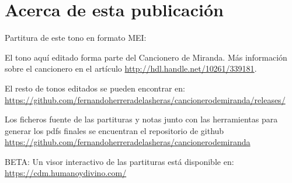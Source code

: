 
\section*{\centering\LARGE{Acerca de esta publicación}}

\vspace{0.5cm}



Partitura de este tono en formato MEI: \href{\mymeilink}{\mymeiname}

\vspace{0.5cm}

El tono aquí editado forma parte del Cancionero de Miranda. Más información sobre el cancionero en el artículo \url{http://hdl.handle.net/10261/339181}.

\vspace{0.5cm}

El resto de tonos editados se pueden encontrar en: \url{https://github.com/fernandoherreradelasheras/cancionerodemiranda/releases/}

\vspace{0.5cm}

Los ficheros fuente de las partituras y notas junto con las herramientas para generar los pdfs finales se encuentran el repositorio de github \url{https://github.com/fernandoherreradelasheras/cancionerodemiranda}

\vspace{0.5cm}

BETA: Un visor interactivo de las partituras está disponible en: \url{https://cdm.humanoydivino.com/} 





